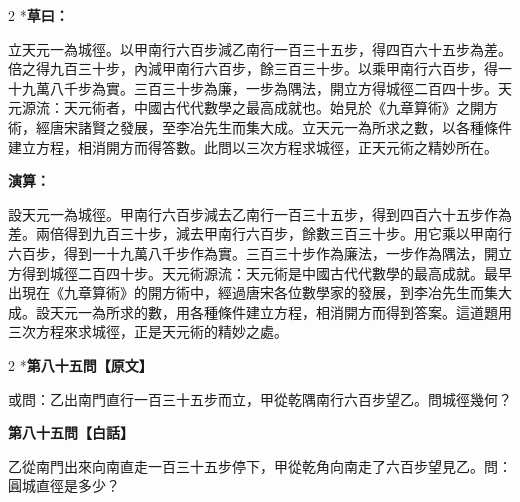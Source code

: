 \documentclass[11pt,a4paper]{article}
\begin{document}
\begin{paracol}{2}
\switchcolumn[0]*\textbf{草曰：}

\small 立天元一為城徑。以甲南行六百步減乙南行一百三十五步，得四百六十五步為差。倍之得九百三十步，內減甲南行六百步，餘三百三十步。以乘甲南行六百步，得一十九萬八千步為實。三百三十步為廉，一步為隅法，開立方得城徑二百四十步。天元源流：天元術者，中國古代代數學之最高成就也。始見於《九章算術》之開方術，經唐宋諸賢之發展，至李冶先生而集大成。立天元一為所求之數，以各種條件建立方程，相消開方而得答數。此問以三次方程求城徑，正天元術之精妙所在。

\switchcolumn\textbf{演算：}

\small 設天元一為城徑。甲南行六百步減去乙南行一百三十五步，得到四百六十五步作為差。兩倍得到九百三十步，減去甲南行六百步，餘數三百三十步。用它乘以甲南行六百步，得到一十九萬八千步作為實。三百三十步作為廉法，一步作為隅法，開立方得到城徑二百四十步。天元術源流：天元術是中國古代代數學的最高成就。最早出現在《九章算術》的開方術中，經過唐宋各位數學家的發展，到李冶先生而集大成。設天元一為所求的數，用各種條件建立方程，相消開方而得到答案。這道題用三次方程來求城徑，正是天元術的精妙之處。
\end{paracol}

\vspace{0.1cm}
\noindent{}
\par\vspace{0.3cm}

\begin{paracol}{2}
\switchcolumn[0]*\noindent\textbf{第八十五問【原文】}

\small 或問：乙出南門直行一百三十五步而立，甲從乾隅南行六百步望乙。問城徑幾何？

\switchcolumn\noindent\textbf{第八十五問【白話】}

\small 乙從南門出來向南直走一百三十五步停下，甲從乾角向南走了六百步望見乙。問：圓城直徑是多少？
\end{paracol}

\vspace{0.1cm}
\noindent{}
\par\vspace{0.15cm}
\end{document}
